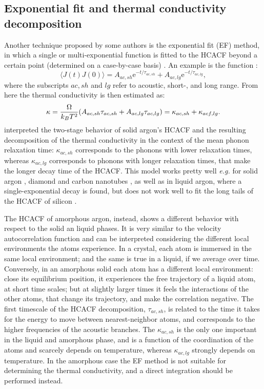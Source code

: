 \subsection{Exponential fit and thermal conductivity decomposition}
Another technique proposed by some authors is the exponential fit (EF) method, in which a single or multi-exponential function is fitted to the HCACF beyond a certain point (determined on a case-by-case basis) \cite{Che2000a,Li1998,Zhang2015}. An example is the function \cite{Che2000a}:
\begin{equation}
    \langle J(t) J(0) \rangle = A_{ac,sh} \mathrm{e}^{-t/\tau_{ac,sh}} + A_{ac,lg} \mathrm{e}^{-t/\tau_{ac,lg}},
\end{equation}
where the subscripts $ac,sh$ and $lg$ refer to acoustic, short-, and long range. From here the thermal conductivity is then estimated as:
\begin{equation}
    \kappa = \frac{{\mathrm\Omega}}{k_B T^2} (A_{ac,sh}\tau_{ac,sh} + A_{ac,lg}\tau_{ac,lg})  =  \kappa_{ac,sh} + \kappa_{acf,lg}.
\end{equation}
\citet{McGaughey2004a} interpreted the two-stage behavior of solid argon's HCACF and the resulting decomposition of the thermal conductivity in the context of the mean phonon relaxation time: $\kappa_{ac,sh}$ corresponds to the phonons with lower relaxation times, whereas $\kappa_{ac,lg}$ corresponds to phonons with longer relaxation times, that make the longer decay time of the HCACF.
This model works pretty well \emph{e.g.} for solid argon \cite{McGaughey2004a}, diamond and carbon nanotubes \cite{Che2000a,Che2000b}, as well as in liquid argon, where a single-exponential decay is found, but does not work well to fit the long tails of the HCACF of silicon \cite{Schelling2002}.

The HCACF of amorphous argon, instead, shows a different behavior with respect to the solid an liquid phases. It is very similar to the velocity autocorrelation function and can be interpreted considering the different local environments the atoms experience. In a crystal, each atom is immersed in the same local environment; and the same is true in a liquid, if we average over time. Conversely, in an amorphous solid each atom has a different local environment: close its equilibrium position, it experiences the free trajectory of a liquid atom, at short time scales; but at slightly larger times it feels the interactions of the other atoms, that change its trajectory, and make the correlation negative. 
The first timescale of the HCACF decomposition, $\tau_{ac,sh}$, is related to the time it takes for the energy to move between nearest-neighbor atoms, and corresponds to the higher frequencies of the acoustic branches. The $\kappa_{ac,sh}$ is the only one important in the liquid and amorphous phase, and is a function of the coordination of the atoms  and scarcely depends on temperature, whereas $\kappa_{ac,lg}$ strongly depends on temperature.
In the amorphous case the EF method is not suitable for determining the thermal conductivity, and a direct integration should be performed instead. 


